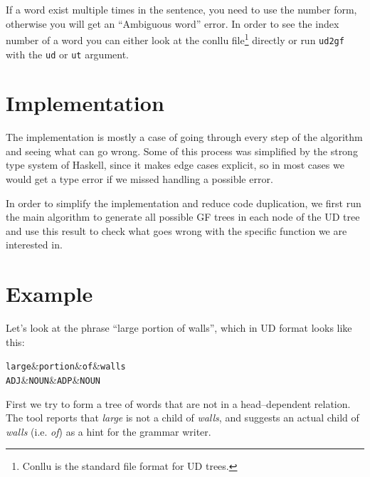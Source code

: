 If a word exist multiple times in the sentence, you need to use the number form, otherwise you will get an ``Ambiguous word'' error. In order to see the index number of a word you can either look at the conllu file\footnote{Conllu is the standard file format for UD trees.} directly or run \verb|ud2gf| with the \verb|ud| or \verb|ut| argument.


\section{Implementation}

The implementation is mostly a case of going through every step of the algorithm and seeing what can go wrong. Some of this process was simplified by the strong type system of Haskell, since it makes edge cases explicit, so in most cases we would get a type error if we missed handling a possible error.

In order to simplify the implementation and reduce code duplication, we first run the main algorithm to generate all possible GF trees in each node of the UD tree and use this result to check what goes wrong with the specific function we are interested in.

\section{Example}

Let's look at the phrase ``large portion of walls'', which in UD format looks like this:

\begin{center}
    \begin{dependency}
        \begin{deptext}[column sep=0.4cm]
              {\tt large}\&{\tt portion}\&{\tt of}\&{\tt walls}\\
            {\tt ADJ}\&{\tt NOUN}\&{\tt ADP}\&{\tt NOUN}\\
        \end{deptext}
    \end{dependency}
\end{center}
    
First we try to form a tree of words that are not in a head--dependent relation. The tool reports that \emph{large} is not a child of \emph{walls}, and suggests an actual child of \emph{walls} (i.e. \emph{of}) as a hint for the grammar writer.

